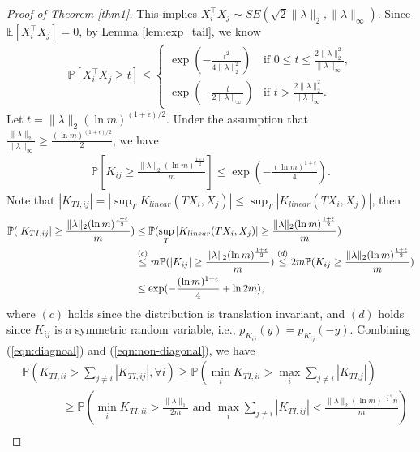 \documentclass{article}
\theoremstyle{plain}
\theoremstyle{definition}
\theoremstyle{remark}
\begin{document}
\begin{proof}[Proof of Theorem \ref{thm1}]
This implies $X_i^\top X_j \sim SE( \sqrt{2}\|\lambda\|_2, \|\lambda\|_\infty)$. Since $\mathbb{E}[X_i^\top X_j] = 0$, by Lemma \ref{lem:exp_tail}, we know
\begin{align*}
    \mathbb{P}\left[X_i^\top X_j \geq  t\right] \leq
    \begin{cases}
    \exp(-\frac{t^2}{4 \|\lambda\|_2^2}) & \text{if } 0 \le t \le \frac{2\|\lambda\|_2^2}{ \|\lambda\|_{\infty}},\\
    \exp(-\frac{t}{2 \|\lambda\|_{\infty}}) & \text{if } t > \frac{2\|\lambda\|_2^2}{ \|\lambda\|_{\infty}}.
    \end{cases}
\end{align*}
Let $t = \|\lambda\|_2 (\ln m)^{(1 + \epsilon)/2}$. Under the assumption that $\frac{\|\lambda\|_{2}}{\|\lambda\|_\infty} \geq \frac{(\ln m)^{(1+\epsilon)/2}}{2}$, we have
\begin{align}
\label{eqn:concentration_bound}
    \mathbb{P}\left[K_{ij} \geq \frac{\|\lambda\|_2 (\ln m)^{\frac{1+\epsilon}{2}}}{m}\right] \leq \exp(-\frac{(\ln m)^{1 + \epsilon}}{4}).
\end{align}
Note that $|K_{TI, ij}| = |\sup_T K_{linear}(T X_i, X_j)| \le \sup_T |K_{linear}(T X_i, X_j)|$, then
\begin{align}
\label{eqn:non-diagonal}
\mathbb{P}(|K_{TI, ij}| \ge \frac{\|\lambda\|_2 (\ln m)^{\frac{1+\epsilon}{2}}}{m}) &\le \mathbb{P}(\sup_T |K_{linear}(T X_i, X_j)| \ge \frac{\|\lambda\|_2 (\ln m)^{\frac{1+\epsilon}{2}}}{m}) \notag\\
&\stackrel{(c)}{\leq} m \mathbb{P}(|K_{ij}| \ge \frac{\|\lambda\|_2 (\ln m)^{\frac{1+\epsilon}{2}}}{m}) \stackrel{(d)}{\leq} 2m \mathbb{P}(K_{ij} \ge \frac{\|\lambda\|_2 (\ln m)^{\frac{1+\epsilon}{2}}}{m}) \notag\\
&\leq \exp(-\frac{(\ln m)^{1 + \epsilon}}{4} + \ln 2m),
\end{align}
where $(c)$ holds since the distribution is translation invariant, and $(d)$ holds since $K_{ij}$ is a symmetric random variable, i.e., $p_{K_{ij}}(y) = p_{K_{ij}}(-y)$. Combining (\ref{eqn:diagnoal}) and (\ref{eqn:non-diagonal}), we have
\begin{align*}
&\mathbb{P}(K_{TI, ii} > \sum_{j \neq i} |K_{TI, ij}|, \forall i) \ge \mathbb{P}(\min_i K_{TI, ii} > \max_i \sum_{j \neq i}|K_{TI_ij}|)\\
& \  \ \ \ \ \ \ \ \ \ \ \ \ \ \ \ \ge  \mathbb{P}(\min_i K_{TI, ii} > \frac{\|\lambda\|_1}{2 m} \text{ and } \max_i \sum_{j \ne i}|K_{TI, ij}|<\frac{\|\lambda\|_2 (\ln m)^{\frac{1+\epsilon}{2}}n}{m})\\

\end{align*}
\end{proof}
\end{document}
